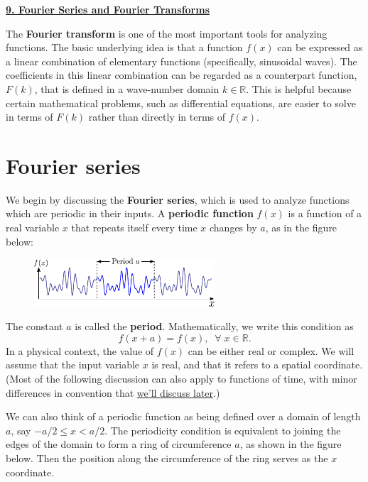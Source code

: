 \documentclass[10pt,a4paper]{article}
\begin{document}
\setcounter{page}{68}
\noindent
\underline{\textbf{\LARGE 9. Fourier Series and Fourier Transforms}}
\vskip 0.1in
    
The \textbf{Fourier transform} is one of the most important tools for
analyzing functions. The basic underlying idea is that a function
$f(x)$ can be expressed as a linear combination of elementary
functions (specifically, sinusoidal waves). The coefficients in this
linear combination can be regarded as a counterpart function, $F(k)$,
that is defined in a wave-number domain $k \in \mathbb{R}$. This is
helpful because certain mathematical problems, such as differential
equations, are easier to solve in terms of $F(k)$ rather than directly
in terms of $f(x)$.

\section{Fourier series}\label{fourier-series}

We begin by discussing the \textbf{Fourier series}, which is used to
analyze functions which are periodic in their inputs. A \textbf{periodic
function} $f(x)$ is a function of a real variable $x$ that repeats
itself every time $x$ changes by $a$, as in the figure below:

\begin{figure}[h]
  \centering\includegraphics[width=0.6\textwidth]{periodicity}
\end{figure}

The constant $a$ is called the \textbf{period}. Mathematically, we
write this condition as
\begin{equation}
  f(x+a) = f(x), \;\; \forall\; x\in \mathbb{R}.
\end{equation}
In a physical context, the value of $f(x)$ can be either real or
complex. We will assume that the input variable $x$ is real, and that
it refers to a spatial coordinate. (Most of the following discussion
can also apply to functions of time, with minor differences in
convention that \hyperref[fourier_time]{we'll discuss later}.)

We can also think of a periodic function as being defined over a domain
of length $a$, say $-a/2 \le x < a/2$. The periodicity condition is
equivalent to joining the edges of the domain to form a ring of
circumference $a$, as shown in the figure below. Then the position
along the circumference of the ring serves as the $x$ coordinate.
\end{document}
